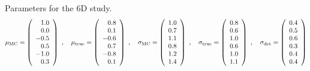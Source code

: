 
\noindent
Parameters for the 6D study. 
\[
\mu_{\rm MC} = 
\left(
\begin{array}{r}
1.0 \\ 0.0 \\ -0.5 \\ 0.5 \\ -1.0 \\ 0.3 \\
\end{array}
\right) \ ,
\ \ \
\mu_{\rm true} = 
\left(
\begin{array}{r}
0.8 \\ 0.1 \\ -0.6 \\ 0.7 \\ -0.8 \\ 0.1 \\
\end{array}
\right) \ ,
\ \ \
\sigma_{\rm MC} =
\left(
\begin{array}{r}
1.0 \\ 0.7 \\ 1.1 \\ 0.8 \\ 1.2 \\ 1.4 \\
\end{array}
\right) \ ,
\ \ \
\sigma_{\rm true} =
\left(
\begin{array}{r}
0.8 \\ 0.6 \\ 1.0 \\ 0.6 \\ 1.0 \\ 1.1 \\
\end{array}
\right) \ ,
\ \ \ 
\sigma_{\rm det} = 
\left(
\begin{array}{r}
0.4 \\ 0.5 \\ 0.6 \\ 0.3 \\ 0.4 \\ 0.4 \\
\end{array}
\right)
\]
%
